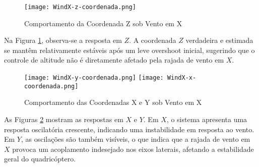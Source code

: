 \begin{figure}[H]
    \centering
    \texttt{[image: WindX-z-coordenada.png]}
    \caption{Comportamento da Coordenada Z sob Vento em X}
    \label{fig:WindX-z-coordenada}
\end{figure}

Na Figura \ref{fig:WindX-z-coordenada}, observa-se a resposta em \(Z\). A coordenada \(Z\) verdadeira e estimada se mantêm relativamente estáveis após um leve overshoot inicial, sugerindo que o controle de altitude não é diretamente afetado pela rajada de vento em \(X\).

\begin{figure}[H]
    \centering
    \texttt{[image: WindX-y-coordenada.png]}
    \hfill
    \texttt{[image: WindX-x-coordenada.png]}
    \caption{Comportamento das Coordenadas X e Y sob Vento em X}
    \label{fig:WindX-x-y-coordenada}
\end{figure}

As Figuras \ref{fig:WindX-x-y-coordenada} mostram as respostas em \(X\) e \(Y\). Em \(X\), o sistema apresenta uma resposta oscilatória crescente, indicando uma instabilidade em resposta ao vento. Em \(Y\), as oscilações são também visíveis, o que indica que a rajada de vento em \(X\) provoca um acoplamento indesejado nos eixos laterais, afetando a estabilidade geral do quadricóptero.




\printindex
